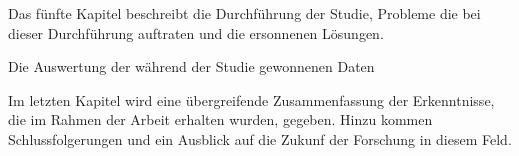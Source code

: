 Das fünfte Kapitel beschreibt die Durchführung der Studie, Probleme die bei dieser Durchführung auftraten und die ersonnenen Lösungen.

Die Auswertung der während der Studie gewonnenen Daten 

Im letzten Kapitel wird eine übergreifende Zusammenfassung der Erkenntnisse, die im Rahmen der Arbeit erhalten wurden, gegeben.
Hinzu kommen Schlussfolgerungen und ein Ausblick auf die Zukunf der Forschung in diesem Feld.


